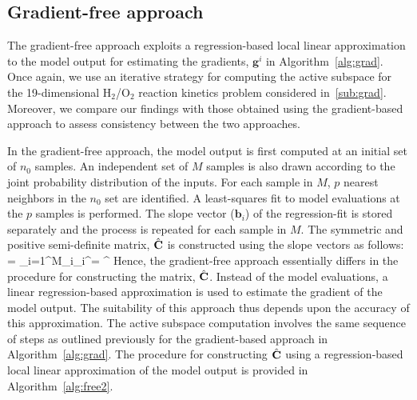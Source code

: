 \subsection{Gradient-free approach}
\label{sub:gradfree}

The gradient-free approach exploits a regression-based local linear
approximation to the model output for estimating the gradients, $\bm{g}^i$
in Algorithm~\ref{alg:grad}. Once again, we use an iterative strategy for
computing the active subspace for the 19-dimensional 
H$_2$/O$_2$ reaction kinetics problem considered in~\ref{sub:grad}.
Moreover, we compare our findings with
those obtained using the gradient-based approach to assess consistency
between the two approaches. 

In the gradient-free approach, the model output is first computed at an initial set of $n_0$ samples. 
An independent set of $M$ samples is also drawn according to the joint probability distribution of the inputs.
For each sample in $M$, $p$ nearest neighbors in the $n_0$ set are identified. A least-squares fit to model
evaluations at the $p$ samples is performed. The slope vector ($\bm{b}_i$) of the regression-fit is stored
separately and the process is repeated for each sample in $M$. The symmetric and positive semi-definite matrix,
$\hat{\mathbf{{C}}}$ is constructed using the slope vectors as follows:
%
\be
{} = \sum\limits_{i=1}^{M}_i_i^\top = \hat{\bm{\Lambda}}^\top
\ee
%
Hence, the gradient-free approach essentially differs in the procedure for constructing the matrix, $\hat{\mathbf{{C}}}$.
Instead of the model evaluations, a linear regression-based approximation is used to estimate the gradient of
the model output. The suitability of this approach thus depends upon the accuracy of this approximation. 
The active subspace computation involves the same sequence of steps as outlined previously for the gradient-based 
approach in Algorithm~\ref{alg:grad}. The procedure for constructing $\hat{\mathbf{{C}}}$ using a regression-based
local linear approximation
of the model output is provided in Algorithm~\ref{alg:free2}.

